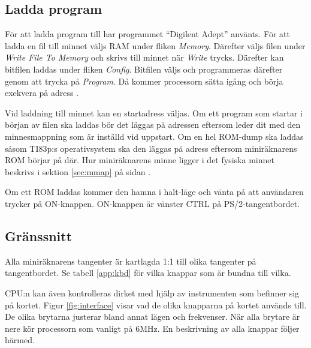 \documentclass[main.tex]{subfiles}
\begin{document}
\subsection{Ladda program}
För att ladda program till har programmet ``Digilent Adept'' använts. För att
ladda en fil till minnet väljs RAM under fliken {\it Memory}. Därefter väljs
filen under {\it Write File To Memory} och skrivs till minnet när {\it Write}
trycks. Därefter kan bitfilen laddas under fliken {\it Config}. Bitfilen väljs
och programmeras därefter genom att trycka på {\it Program}. Då kommer
processorn sätta igång och börja exekvera på adress .

Vid laddning till minnet kan en startadress väljas. Om ett program som startar
i början av filen ska laddas bör det läggas på adressen  eftersom
 leder dit med den minnesmappning som är inställd vid uppstart. Om
en hel ROM-dump ska laddas såsom TI83p:s operativsystem ska den läggas på
adress  eftersom miniräknarens ROM börjar på där. Hur miniräknarens
minne ligger i det fysiska minnet beskrivs i sektion \ref{sec:mmap} på sidan
\pageref{sec:mmap}.

Om ett ROM laddas kommer den hamna i halt-läge och vänta på att användaren
trycker på ON-knappen. ON-knappen är vänster CTRL på PS/2-tangentbordet.

\subsection{Gränssnitt}
Alla miniräknarens tangenter är kartlagda 1:1 till olika tangenter på
tangentbordet. Se tabell \ref{app:kbd} för vilka knappar som är bundna till
vilka.

CPU:n kan även kontrolleras dirket med hjälp av instrumenten som befinner sig
på kortet. Figur \ref{fig:interface} visar vad de olika knapparna på kortet
används till. De olika brytarna justerar bland annat lägen och frekvenser. När
alla brytare är nere kör processorn som vanligt på 6MHz. En beskrivning av alla
knappar följer härmed.
\end{document}
